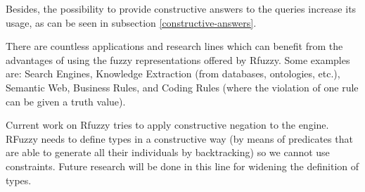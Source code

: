\documentclass[runningheads,a4paper]{llncs}
\begin{document}
Besides, the possibility to provide constructive answers 
to the queries increase its usage, as can be seen in 
subsection \ref{constructive-answers}. 

There are countless applications and research lines which can benefit 
from the advantages of using the fuzzy representations offered
by Rfuzzy. Some examples are: 
Search Engines, Knowledge Extraction (from databases, ontologies, etc.), 
Semantic Web, Business Rules, and
Coding Rules (where the violation of one rule can be given a truth value).

Current work on Rfuzzy tries to apply constructive negation to the
engine.  RFuzzy needs to define types in a constructive way 
(by means of predicates that are able to generate all their 
individuals by backtracking) 
so we cannot use constraints.
Future research will be done in this line for widening the 
definition of types.
\end{document}
